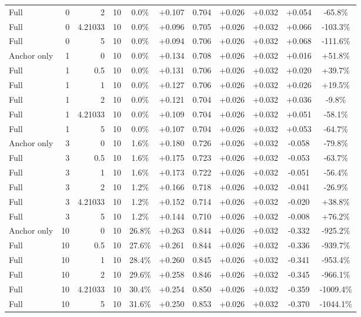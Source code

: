 \begin{table}[htbp]
\begin{tabular}{lrrrccccccc}
Full & 0 & 2 & 10 & 0.0\% & +0.107 & 0.704 & +0.026 & +0.032 & +0.054 & -65.8\% \\
Full & 0 & 4.21033 & 10 & 0.0\% & +0.096 & 0.705 & +0.026 & +0.032 & +0.066 & -103.3\% \\
Full & 0 & 5 & 10 & 0.0\% & +0.094 & 0.706 & +0.026 & +0.032 & +0.068 & -111.6\% \\
Anchor only & 1 & 0 & 10 & 0.0\% & +0.134 & 0.708 & +0.026 & +0.032 & +0.016 & +51.8\% \\
Full & 1 & 0.5 & 10 & 0.0\% & +0.131 & 0.706 & +0.026 & +0.032 & +0.020 & +39.7\% \\
Full & 1 & 1 & 10 & 0.0\% & +0.127 & 0.706 & +0.026 & +0.032 & +0.026 & +19.5\% \\
Full & 1 & 2 & 10 & 0.0\% & +0.121 & 0.704 & +0.026 & +0.032 & +0.036 & -9.8\% \\
Full & 1 & 4.21033 & 10 & 0.0\% & +0.109 & 0.704 & +0.026 & +0.032 & +0.051 & -58.1\% \\
Full & 1 & 5 & 10 & 0.0\% & +0.107 & 0.704 & +0.026 & +0.032 & +0.053 & -64.7\% \\
Anchor only & 3 & 0 & 10 & 1.6\% & +0.180 & 0.726 & +0.026 & +0.032 & -0.058 & -79.8\% \\
Full & 3 & 0.5 & 10 & 1.6\% & +0.175 & 0.723 & +0.026 & +0.032 & -0.053 & -63.7\% \\
Full & 3 & 1 & 10 & 1.6\% & +0.173 & 0.722 & +0.026 & +0.032 & -0.051 & -56.4\% \\
Full & 3 & 2 & 10 & 1.2\% & +0.166 & 0.718 & +0.026 & +0.032 & -0.041 & -26.9\% \\
Full & 3 & 4.21033 & 10 & 1.2\% & +0.152 & 0.714 & +0.026 & +0.032 & -0.020 & +38.8\% \\
Full & 3 & 5 & 10 & 1.2\% & +0.144 & 0.710 & +0.026 & +0.032 & -0.008 & +76.2\% \\
Anchor only & 10 & 0 & 10 & 26.8\% & +0.263 & 0.844 & +0.026 & +0.032 & -0.332 & -925.2\% \\
Full & 10 & 0.5 & 10 & 27.6\% & +0.261 & 0.844 & +0.026 & +0.032 & -0.336 & -939.7\% \\
Full & 10 & 1 & 10 & 28.4\% & +0.260 & 0.845 & +0.026 & +0.032 & -0.341 & -953.4\% \\
Full & 10 & 2 & 10 & 29.6\% & +0.258 & 0.846 & +0.026 & +0.032 & -0.345 & -966.1\% \\
Full & 10 & 4.21033 & 10 & 30.4\% & +0.254 & 0.850 & +0.026 & +0.032 & -0.359 & -1009.4\% \\
Full & 10 & 5 & 10 & 31.6\% & +0.250 & 0.853 & +0.026 & +0.032 & -0.370 & -1044.1\% \\

\end{tabular}
\end{table}
